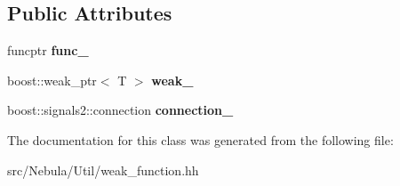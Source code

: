 \subsection*{Public Attributes}
\begin{DoxyCompactItemize}
\item 
\hypertarget{classNeb_1_1weak__function_a74862697c1231b8623d9e800f74cee8d}{funcptr {\bfseries func\-\_\-}}\label{classNeb_1_1weak__function_a74862697c1231b8623d9e800f74cee8d}

\item 
\hypertarget{classNeb_1_1weak__function_a9d75df0eaa7aaf40973f67f6583e5d69}{boost\-::weak\-\_\-ptr$<$ T $>$ {\bfseries weak\-\_\-}}\label{classNeb_1_1weak__function_a9d75df0eaa7aaf40973f67f6583e5d69}

\item 
\hypertarget{classNeb_1_1weak__function_a02370593823d9be862e4177a6d3b0edd}{boost\-::signals2\-::connection {\bfseries connection\-\_\-}}\label{classNeb_1_1weak__function_a02370593823d9be862e4177a6d3b0edd}

\end{DoxyCompactItemize}


The documentation for this class was generated from the following file\-:\begin{DoxyCompactItemize}
\item 
src/\-Nebula/\-Util/weak\-\_\-function.\-hh\end{DoxyCompactItemize}
